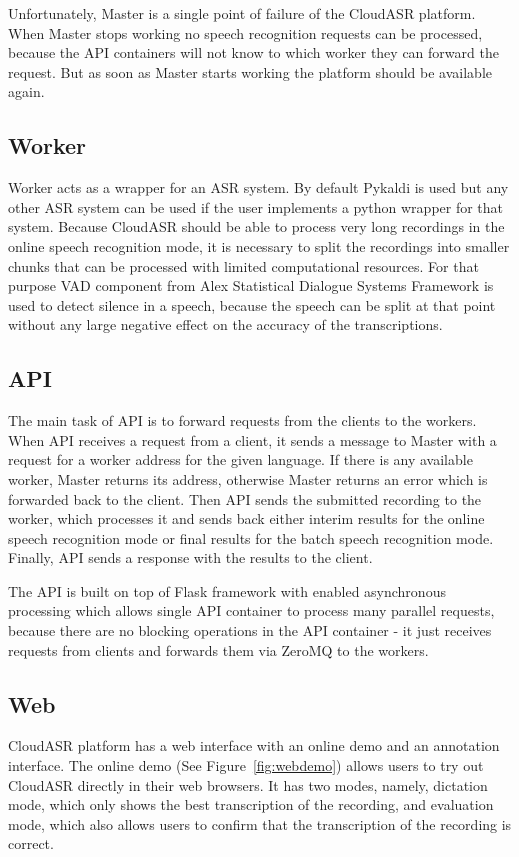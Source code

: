 Unfortunately, Master is a single point of failure of the CloudASR platform.
When Master stops working no speech recognition requests can be processed,
  because the API containers will not know to which worker they can forward the request.
But as soon as Master starts working the platform should be available again.


\subsection{Worker}
Worker acts as a wrapper for an ASR system.
By default Pykaldi is used but any other ASR system can be used
  if the user implements a python wrapper for that system.
Because CloudASR should be able to process very long recordings in the online speech recognition mode,
  it is necessary to split the recordings into smaller chunks
  that can be processed with limited computational resources.
For that purpose VAD component from Alex Statistical Dialogue Systems Framework \cite{jurcicek2014alex} is used to detect silence in a speech,
  because the speech can be split at that point without any large negative effect on the accuracy of the transcriptions.


\subsection{API}
The main task of API is to forward requests from the clients to the workers.
When API receives a request from a client,
  it sends a message to Master with a request for a worker address for the given language.
If there is any available worker, Master returns its address,
  otherwise Master returns an error which is forwarded back to the client.
Then API sends the submitted recording to the worker,
  which processes it
    and sends back either interim results for the online speech recognition mode
      or final results for the batch speech recognition mode.
Finally, API sends a response with the results to the client.

The API is built on top of Flask framework with enabled asynchronous processing
  which allows single API container to process many parallel requests,
  because there are no blocking operations in the API container -
  it just receives requests from clients and forwards them via ZeroMQ to the workers.



\subsection{Web}
CloudASR platform has a web interface with an online demo and an annotation interface.
The online demo (See Figure~\ref{fig:webdemo}) allows users to try out CloudASR directly in their web browsers.
It has two modes, namely, dictation mode, which only shows the best transcription of the recording,
  and evaluation mode, which also allows users to confirm that the transcription of the recording is correct.


